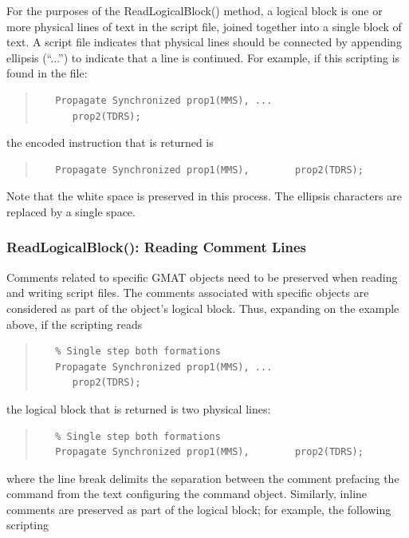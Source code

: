 For the purposes of the ReadLogicalBlock() method, a logical block is one or more physical lines of
text in the script file, joined together into a single block of text.  A script file indicates that
physical lines should be connected by appending ellipsis (``...'') to indicate that a line is
continued.  For example, if this scripting is found in the file:
\begin{quote}
\begin{verbatim}
   Propagate Synchronized prop1(MMS), ...
      prop2(TDRS);
\end{verbatim}
\end{quote}
\noindent the encoded instruction that is returned is
\begin{quote}
\begin{verbatim}
   Propagate Synchronized prop1(MMS),        prop2(TDRS);
\end{verbatim}
\end{quote}

\noindent Note that the white space is preserved in this process.  The ellipsis characters are
replaced by a single space.

\subsubsection{ReadLogicalBlock(): Reading Comment Lines}

Comments related to specific GMAT objects need to be preserved when reading and writing script
files.  The comments associated with specific objects are considered as part of the object's logical
block.  Thus, expanding on the example above, if the scripting reads

\begin{quote}
\begin{verbatim}
   % Single step both formations
   Propagate Synchronized prop1(MMS), ...
      prop2(TDRS);
\end{verbatim}
\end{quote}
\noindent the logical block that is returned is two physical lines:
\begin{quote}
\begin{verbatim}
   % Single step both formations
   Propagate Synchronized prop1(MMS),        prop2(TDRS);
\end{verbatim}
\end{quote}

\noindent where the line break delimits the separation between the comment prefacing the command
from the text configuring the command object.  Similarly, inline comments are preserved as part of
the logical block; for example, the following scripting

